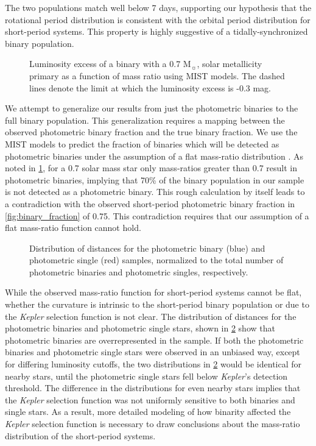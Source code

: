 \documentclass[manuscript]{aastex6}
\newcommand{\Kepler}{\mbox{\textit{Kepler}}}
\begin{document}
The two populations match well below 7 days, supporting our hypothesis that the
rotational period distribution is consistent with the orbital period
distribution for short-period systems. This property is highly suggestive of a
tidally-synchronized binary population.

\begin{figure}[htb]
    \centering
    \caption{Luminosity excess of a binary with a 0.7 M\(_\sun\), solar
    metallicity primary as a function of mass ratio using MIST models. The
dashed lines denote the limit at which the luminosity excess is -0.3 mag.}
    \label{fig:photometric_massratio}
\end{figure}

We attempt to generalize our results from just the photometric binaries to the
full binary population. This generalization requires a mapping between the
observed photometric binary fraction and the true binary fraction. We use the
MIST models to predict the fraction of binaries which will be detected as
photometric binaries under the assumption of a flat mass-ratio distribution
\citep{Raghavan10}. As noted in \cref{fig:photometric_massratio}, for a 0.7
solar mass star only mass-ratios greater than 0.7 result in photometric
binaries, implying that 70\% of the binary population in our sample is not
detected as a photometric binary. This rough calculation by itself leads to a
contradiction with the observed short-period photometric binary fraction in 
\cref{fig:binary_fraction} of 0.75. This contradiction requires that our
assumption of a flat mass-ratio function cannot hold.

\begin{figure}[htb]
    \centering
    \caption{Distribution of distances for the photometric binary (blue) and
    photometric single (red) samples, normalized to the total number of
photometric binaries and photometric singles, respectively.}
    \label{fig:distance_dist}
\end{figure}

While the observed mass-ratio function for short-period systems cannot be flat,
whether the curvature is intrinsic to the short-period binary population or due
to the \Kepler{} selection function is not clear. The distribution of 
distances for the photometric binaries and photometric single stars, shown in
\cref{fig:distance_dist} show that photometric binaries are overrepresented in
the sample. If both the photometric binaries and photometric single stars were
observed in an unbiased way, except for differing luminosity cutoffs, the two
distributions in \cref{fig:distance_dist} would be identical for nearby stars,
until the photometric single stars fell below \Kepler{}'s detection threshold.
The difference in the distributions for even nearby stars implies that the
\Kepler{} selection function was not uniformly sensitive to both binaries and
single stars. As a result, more detailed modeling of how binarity affected the
\Kepler{} selection function is necessary to draw conclusions about the
mass-ratio distribution of the short-period systems.
\end{document}
